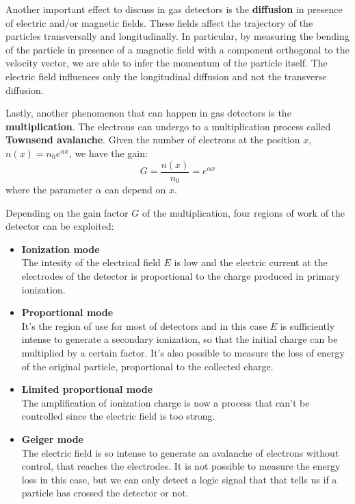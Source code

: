 \documentclass[../../main/main.tex]{subfiles}
\begin{document}
Another important effect to discuss in gas detectors is the \textbf{diffusion} in presence of electric and/or magnetic fields. These fields affect the trajectory of the particles transversally and longitudinally. In particular, by measuring the bending of the particle in presence of a magnetic field with a component orthogonal to the velocity vector, we are able to infer the momentum of the particle itself. The electric field influences only the longitudinal diffusion and not the transverse diffusion.

\medskip
Lastly, another phenomenon that can happen in gas detectors is the \textbf{multiplication}. The electrons can undergo to a multiplication process called \textbf{Townsend avalanche}. Given the number of electrons at the position \( x \), \( n(x) = n_0 e^{\alpha x} \), we have the gain:
\begin{equation}
    G
    =
    \frac{n(x)}{n_0}
    =
    e^{\alpha x}
    \label{eq:L04_MPG}
\end{equation}
where the parameter \( \alpha \) can depend on \( x \).

Depending on the gain factor \( G \) of the multiplication, four regions of work of the detector can be exploited:
\begin{itemize}
    \item \textbf{Ionization mode}\\
		The intesity of the electrical field \( E \) is low and the electric current at the electrodes of the detector is proportional to the charge produced in primary ionization.
	\item \textbf{Proportional mode}\\
		It's the region of use for most of detectors and in this case \( E \) is sufficiently intense to generate a secondary ionization, so that the initial charge can be multiplied by a certain factor. It's also possible to measure the loss of energy of the original particle, proportional to the collected charge.
	\item \textbf{Limited proportional mode}\\
		The amplification of ionization charge is now a process that can't be controlled since the electric field is too strong.
	\item \textbf{Geiger mode}\\
		The electric field is so intense to generate an avalanche of electrons without control, that reaches the electrodes. It is not possible to measure the energy loss in this case, but we can only detect a logic signal that that tells us if a particle has crossed the detector or not.
\end{itemize}
\end{document}
